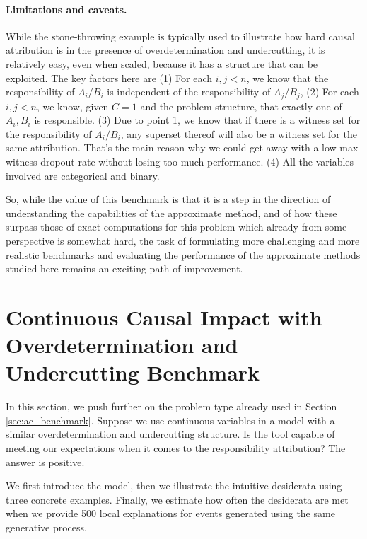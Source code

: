 \documentclass[anon,12pt]{clear2026} %
\begin{document}
\paragraph{Limitations and caveats.}
While the stone-throwing example is typically used to illustrate how hard causal attribution is in the presence of overdetermination and undercutting, it is relatively easy, even when scaled, because it has a structure that can be exploited. 
The key factors here are (1)  For each $i, j <n$, we know that the responsibility of $A_i/B_i$ is independent of the responsibility of $A_j/B_j$, (2)   For each $i,j<n$, we know, given $C=1$ and the problem structure, that exactly one of $A_i, B_i$ is responsible. (3)  Due to point 1, we know that if there is a witness set for the responsibility of $A_i/B_i$, any superset thereof will also be a witness set for the same attribution. That's the main reason why we could get away with a low max-witness-dropout rate without losing too much performance.
(4)  All the variables involved are categorical and binary. 

So, while the value of this benchmark is that it is a step in the direction of understanding the capabilities of the approximate method, and of how these surpass those of exact computations for this problem which already from some perspective is somewhat hard, the task of formulating more challenging and more realistic benchmarks and evaluating the performance of the approximate methods studied here remains an exciting path of improvement. 

\section{Continuous Causal Impact with Overdetermination and Undercutting Benchmark}\label{sec:con_benchmark}

In this section, we push further on the problem type already used in Section \ref{sec:ac_benchmark}. Suppose we use continuous variables in a model with a similar overdetermination and undercutting structure. Is the tool capable of meeting our expectations when it comes to the responsibility attribution?  The answer is positive. 

We first introduce the model, then we illustrate the intuitive desiderata using three concrete examples. Finally, we estimate how often the desiderata are met when we provide 500 local explanations for events generated using the same generative process.
\end{document}
